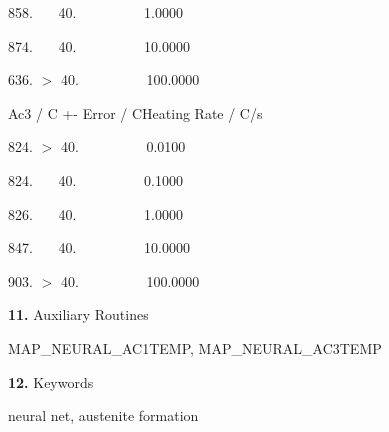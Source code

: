 \item{            858.}         ~~~40.    \indent~~~~~~~~~1.0000
\item{            874.}         ~~~40.    \indent~~~~~~~~~10.0000
\item{            636.}         $>$ 40.   \indent~~~~~~~~~100.0000
\medskip
\item{         Ac3 / C}      +- Error / C\indent Heating Rate / C/s
\item{            824.}        $>$ 40.   \indent~~~~~~~~~0.0100
\item{            824.}         ~~~40.   \indent~~~~~~~~~0.1000
\item{            826.}         ~~~40.   \indent~~~~~~~~~1.0000
\item{            847.}         ~~~40.   \indent~~~~~~~~~10.0000
\item{            903.}        $>$ 40.   \indent~~~~~~~~~100.0000
\parindent=0.5in
\item{\bf 11.} {\largeb  Auxiliary Routines}
\bigskip
\item {} MAP\_NEURAL\_AC1TEMP, MAP\_NEURAL\_AC3TEMP
\item{\bf 12.} {\largeb  Keywords}
\bigskip
\item {} neural net, austenite formation
\bye

